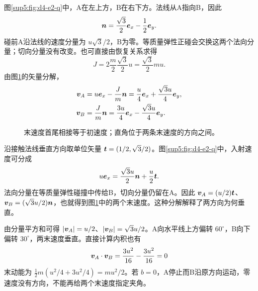 \begin{solution}
图\ref{sup5:fig:d4-e2-q}中，A在左上方，B在右下方。法线从A指向B，因此
\begin{equation}
 \bm{n}=\frac{\sqrt3}{2}\bm{e}_x-\frac12\bm{e}_y.
\end{equation}
碰前A沿法线的速度分量为 $u\sqrt3/2$，B为零。等质量弹性正碰会交换这两个法向分量；切向分量没有改变。也可直接由恢复关系求得
\begin{equation}
 J=2\frac m2\frac{\sqrt3}2u=\frac{\sqrt3}2mu.
\end{equation}
由图\ref{sup5:fig:d4-e2-s}的矢量分解，
\begin{align}
 \bm{v}_A&=u\bm{e}_x-\frac Jm\bm{n}
 =\frac u4\bm{e}_x+\frac{\sqrt3u}4\bm{e}_y,\\
 \bm{v}_B&=\frac Jm\bm{n}
 =\frac{3u}4\bm{e}_x-\frac{\sqrt3u}4\bm{e}_y.
\end{align}
\begin{figure}[H]\centering
{}
\caption{末速度首尾相接等于初速度；直角位于两条末速度的方向之间。}\label{sup5:fig:d4-e2-s}
\end{figure}
沿接触法线垂直方向取单位矢量 $\bm{t}=(1/2,\sqrt3/2)$。图\ref{sup5:fig:d4-e2-q}中，入射速度可分成
\[
u\bm{e}_x=\frac{\sqrt3u}{2}\bm{n}+\frac u2\bm{t}.
\]
法向分量在等质量弹性碰撞中传给B，切向分量仍留在A。因此 $\bm{v}_A=(u/2)\bm{t}$、$\bm{v}_B=(\sqrt3u/2)\bm{n}$，也就得到图\ref{sup5:fig:d4-e2-s}中的两个末速度。这种分解解释了两方向为何垂直。

由分量平方和可得 $|\bm{v}_A|=u/2$、$|\bm{v}_B|=\sqrt3u/2$。A向水平线上方偏转 $60^\circ$，B向下偏转 $30^\circ$，两末速度垂直。直接计算内积也有
\begin{equation}
 \bm{v}_A\cdot\bm{v}_B
 =\frac{3u^2}{16}-\frac{3u^2}{16}=0
\end{equation}
末动能为 $\tfrac12m(u^2/4+3u^2/4)=mu^2/2$。若 $b=0$，A停止而B沿原方向运动，零速度没有方向，不能再给两个末速度指定夹角。
\end{solution}



